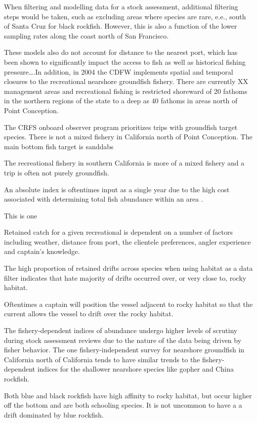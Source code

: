 \documentclass[
  authoryear,
  preprint,
  3p]{elsarticle}
\begin{document}
When filtering and modelling data for a stock assessment, additional
filtering steps would be taken, such as excluding areas where species
are rare, e.e., south of Santa Cruz for black rockfish. However, this is
also a function of the lower sampling rates along the coast north of San
Francisco.

These models also do not account for distance to the nearest port, which
has been shown to significantly impact the access to fish as well as
historical fishing pressure\ldots.In addition, in 2004 the CDFW
implements spatial and temporal closures to the recreational nearshore
groundfish fishery. There are currently XX management areas and
recreational fishing is restricted shoreward of 20 fathoms in the
northern regions of the state to a deep as 40 fathoms in areas north of
Point Conception.

The CRFS onboard observer program prioritizes trips with groundfish
target species. There is not a mixed fishery in California north of
Point Conception. The main bottom fish target is sanddabs

The recreational fishery in southern California is more of a mixed
fishery and a trip is often not purely groundfish.

An absolute index is oftentimes input as a single year due to the high
cost associated with determining total fish abundance within an area
\citep{Love:2009:DFA}.

This is one

Retained catch for a given recreational is dependent on a number of
factors including weather, distance from port, the clientele
preferences, angler experience and captain's knowledge.

The high proportion of retained drifts across species when using habitat
as a data filter indicates that hate majority of drifts occurred over,
or very close to, rocky habitat.

Oftentimes a captain will position the vessel adjacent to rocky habitat
so that the current allows the vessel to drift over the rocky habitat.

The fishery-dependent indices of abundance undergo higher levels of
scrutiny during stock assessment reviews due to the nature of the data
being driven by fisher behavior. The one fishery-independent survey for
nearshore groundfish in California north of California tends to have
similar trends to the fishery-dependent indices for the shallower
nearshore species like gopher and China rockfish.

Both blue and black rockfish have high affinity to rocky habitat, but
occur higher off the bottom and are both schooling species. It is not
uncommon to have a a drift dominated by blue rockfish.
\end{document}
